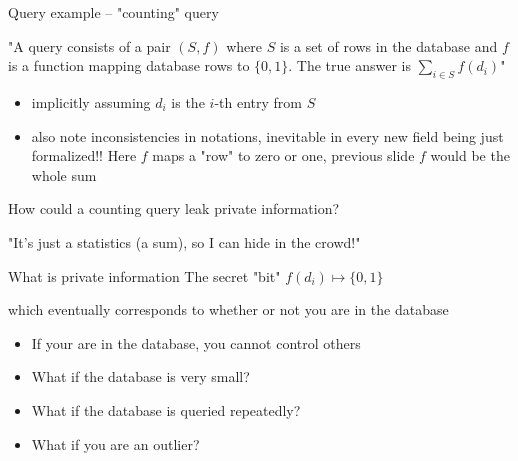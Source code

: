 \documentclass[12pt,aspectratio=169,handout]{beamer}
\begin{document}
\begin{frame}{Query example -- "counting" query}

"A query consists of a pair $(S, f)$ where $S$ is a set of rows in the database and $f$ is a function mapping database rows to $\{0, 1\}$. The true answer is $\sum_{i \in S} f(d_i)$"

\begin{itemize}
\item implicitly assuming $d_i$ is the $i$-th entry from $S$
\item also note inconsistencies in notations, inevitable in every new field being just formalized!! Here $f$ maps a "row" to zero or one, previous slide $f$ would be the whole sum
\end{itemize}

\end{frame}


\begin{frame}{How could a counting query leak private information?}

"It's just a statistics (a sum), so I can hide in the crowd!"

\begin{block}{What is private information}
The secret "bit" $f(d_i) \mapsto \{0, 1\}$

which eventually corresponds to whether or not you are in the database
\end{block}


\begin{itemize}
\item If your are in the database, you cannot control others
\item What if the database is very small?
\item What if the database is queried repeatedly?
\item What if you are an outlier?
\end{itemize}




\end{frame}
\end{document}

